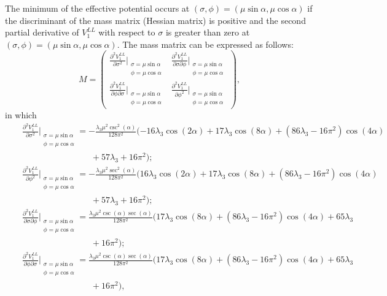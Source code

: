 \documentclass[11pt,a4paper,english,superscriptaddress,preprint,aps,prd]{revtex4}
\begin{document}
The minimum of the effective potential occurs at $(\sigma,\phi)=(\mu\sin\alpha,\mu\cos\alpha)$ if the discriminant of the mass matrix (Hessian matrix) is positive and the second partial derivative of $V^{LL}_1$ with respect to $\sigma$ is greater than zero at $(\sigma,\phi)=(\mu\sin\alpha,\mu\cos\alpha)$. The mass matrix can be expressed as follows:
\begin{equation}\label{massmatrix}
 M = \begin{pmatrix}
  \frac{\partial^2 V^{LL}_1}{\partial \sigma^2}\Bigr |_{\substack{\sigma=\mu\sin\alpha\\\phi=\mu\cos\alpha}} & \frac{\partial^2 V^{LL}_1}{\partial \sigma\partial\phi}\Bigr |_{\substack{\sigma=\mu\sin\alpha\\\phi=\mu\cos\alpha}}\\ 
  \frac{\partial^2 V^{LL}_1}{\partial \phi\partial\sigma}\Bigr |_{\substack{\sigma=\mu\sin\alpha\\\phi=\mu\cos\alpha}} & \frac{\partial^2 V^{LL}_1}{\partial \phi^2}\Bigr |_{\substack{\sigma=\mu\sin\alpha\\\phi=\mu\cos\alpha}}
\end{pmatrix},
\end{equation}
in which
\begin{subequations}
 \begin{eqnarray}
  &&\frac{\partial^2 V^{LL}_1}{\partial \sigma^2}\Bigr |_{\substack{\sigma=\mu\sin\alpha\\\phi=\mu\cos\alpha}} = -\frac{\lambda_3 \mu ^2 \csc ^2(\alpha )}{128 \pi ^2} (-16 \lambda_3 \cos (2 \alpha )+17 \lambda_3 \cos (8 \alpha )+\left(86 \lambda_3-16 \pi ^2\right) \cos (4 \alpha )\nonumber\\
  &&\qquad\qquad\qquad\qquad+57 \lambda_3+16 \pi ^2);\\
  &&\frac{{\partial^2 V^{LL}_1}}{\partial \phi^2}\Bigr |_{\substack{\sigma=\mu\sin\alpha\\\phi=\mu\cos\alpha}} = -\frac{\lambda_3 \mu ^2 \sec ^2(\alpha )}{128 \pi ^2} (16 \lambda_3 \cos (2 \alpha )+17 \lambda_3 \cos (8 \alpha )+\left(86 \lambda_3-16 \pi ^2\right) \cos (4 \alpha ) \nonumber\\
  &&\qquad\qquad\qquad\qquad+57 \lambda_3+16 \pi ^2);\\
  && \frac{\partial^2 V^{LL}_1}{\partial \sigma\partial\phi}\Bigr |_{\substack{\sigma=\mu\sin\alpha\\\phi=\mu\cos\alpha}} = \frac{\lambda_3 \mu ^2 \csc (\alpha ) \sec (\alpha )}{128 \pi ^2} (17 \lambda_3 \cos (8 \alpha )+\left(86 \lambda_3-16 \pi ^2\right) \cos (4 \alpha )+65 \lambda_3\nonumber\\
  &&\qquad\qquad\qquad\qquad+16 \pi ^2);\\
  && \frac{\partial^2 V^{LL}_1}{\partial \phi\partial\sigma}\Bigr |_{\substack{\sigma=\mu\sin\alpha\\\phi=\mu\cos\alpha}} = \frac{\lambda_3 \mu ^2 \csc (\alpha ) \sec (\alpha )}{128 \pi ^2} (17 \lambda_3 \cos (8 \alpha )+\left(86 \lambda_3-16 \pi ^2\right) \cos (4 \alpha )+65 \lambda_3\nonumber\\
  &&\qquad\qquad\qquad\qquad+16 \pi ^2),
 \end{eqnarray}
\end{subequations}
\end{document}

